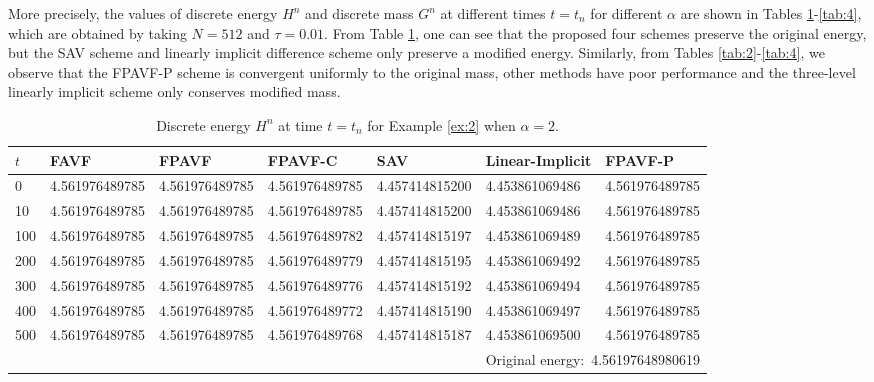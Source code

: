 \documentclass[preprint,compress,3p,10pt,fleqn]{elsarticle}
\numberwithin{equation}{section}
\begin{document}
More precisely, the values of discrete energy $H^n$ and discrete mass $G^n$ at different times $t=t_n$ for different $\alpha$ are shown in Tables \ref{tab:1}-\ref{tab:4},
which are obtained by taking $N=512$ and $\tau=0.01$. From Table \ref{tab:1}, one can see that the proposed four schemes preserve the original energy, but the SAV scheme and linearly implicit difference scheme only preserve a modified energy. Similarly, from Tables \ref{tab:2}-\ref{tab:4}, we observe that the FPAVF-P scheme is convergent uniformly to the original mass, other methods have poor performance and the three-level linearly implicit scheme only conserves modified mass.



\begin{table}[H]\small
	\centering
	\caption{Discrete energy $H^n$ at time $t=t_n$ for Example \ref{ex:2} when $\alpha=2$.}
	  \begin{tabular}{lllllll}
	  \toprule
       $t$   &FAVF   &FPAVF   &FPAVF-C   &SAV    &Linear-Implicit   &FPAVF-P\\
	  \midrule
	  0     &4.561976489785   &4.561976489785   &4.561976489785   &4.457414815200   &4.453861069486   &4.561976489785 \\
	  10    &4.561976489785   &4.561976489785   &4.561976489785   &4.457414815200   &4.453861069486   &4.561976489785 \\
	  100   &4.561976489785   &4.561976489785   &4.561976489782   &4.457414815197   &4.453861069489   &4.561976489785 \\
	  200   &4.561976489785   &4.561976489785   &4.561976489779   &4.457414815195   &4.453861069492   &4.561976489785 \\
	  300   &4.561976489785   &4.561976489785   &4.561976489776   &4.457414815192   &4.453861069494   &4.561976489785 \\
	  400   &4.561976489785   &4.561976489785   &4.561976489772   &4.457414815190   &4.453861069497   &4.561976489785 \\
	  500   &4.561976489785   &4.561976489785   &4.561976489768   &4.457414815187   &4.453861069500   &4.561976489785 \\
	  \midrule
	  \multicolumn{7}{r}{Original energy:~4.56197648980619} \\
	  \bottomrule
	  \end{tabular}\label{tab:1}%
  \end{table}%
\end{document}
